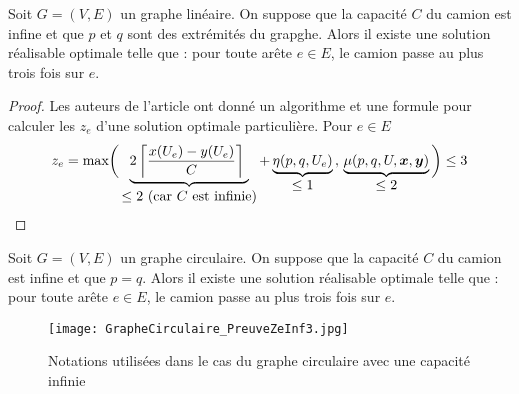 \begin{prop}\label{Ze inf 3 - lineaire}
Soit $G=(V,E)$ un graphe linéaire. On suppose que la capacité $C$ du camion est infine et que $p$ et $q$ sont des extrémités du grapghe. Alors il existe une solution réalisable optimale telle que : pour toute arête $e \in E$, le camion passe au plus trois fois sur $e$.
\end{prop}

\begin{proof}
Les auteurs de l'article \cite{Benchimol2011} ont donné un algorithme et une formule pour calculer les $z_e$ d'une solution optimale particulière. Pour $e \in E$
\begin{gather*}
  z_e = \mbox{max}
  \bigg(
    \underbrace{ 2 \left\lceil \frac{x(U_e)-y(U_e)}{C} \right\rceil\ }_{\displaystyle \le 2 \mbox{ (car } C\mbox{ est infinie)} } +
    \underbrace{ \eta(p,q,U_e) }_{\displaystyle \le 1}\,,\,
    \underbrace{ \mu(p,q,U,\bs{x},\bs{y}) }_{\displaystyle \le 2}
  \bigg)
  \le 3
\end{gather*}
\end{proof}

\begin{lem}\label{Ze inf 3 - circulaire}
Soit $G=(V,E)$ un graphe circulaire. On suppose que la capacité $C$ du camion est infine et que $p=q$. Alors il existe une solution réalisable optimale telle que : pour toute arête $e \in E$, le camion passe au plus trois fois sur $e$.
\end{lem}

\begin{figure}[ht]
  \centering
  \texttt{[image: GrapheCirculaire\_PreuveZeInf3.jpg]}
  \caption{Notations utilisées dans le cas du graphe circulaire avec une capacité infinie}
  \label{Notation graphe circulaire preuve Ze inf 3}
\end{figure}

